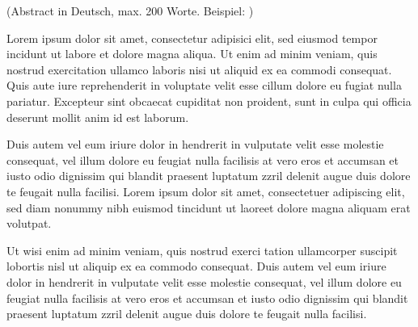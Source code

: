 (Abstract in Deutsch, max. 200 Worte. Beispiel: \cite{loremIpsum})

Lorem ipsum dolor sit amet, consectetur adipisici elit, sed eiusmod tempor
incidunt ut labore et dolore magna aliqua. Ut enim ad minim veniam, quis
nostrud exercitation ullamco laboris nisi ut aliquid ex ea commodi consequat.
Quis aute iure reprehenderit in voluptate velit esse cillum dolore eu fugiat
nulla pariatur. Excepteur sint obcaecat cupiditat non proident, sunt in culpa
qui officia deserunt mollit anim id est laborum.

Duis autem vel eum iriure dolor in hendrerit in vulputate velit esse molestie
consequat, vel illum dolore eu feugiat nulla facilisis at vero eros et
accumsan et iusto odio dignissim qui blandit praesent luptatum zzril delenit
augue duis dolore te feugait nulla facilisi. Lorem ipsum dolor sit amet,
consectetuer adipiscing elit, sed diam nonummy nibh euismod tincidunt ut
laoreet dolore magna aliquam erat volutpat.

Ut wisi enim ad minim veniam, quis nostrud exerci tation ullamcorper suscipit
lobortis nisl ut aliquip ex ea commodo consequat. Duis autem vel eum iriure
dolor in hendrerit in vulputate velit esse molestie consequat, vel illum dolore
eu feugiat nulla facilisis at vero eros et accumsan et iusto odio dignissim qui
blandit praesent luptatum zzril delenit augue duis dolore te feugait nulla
facilisi.